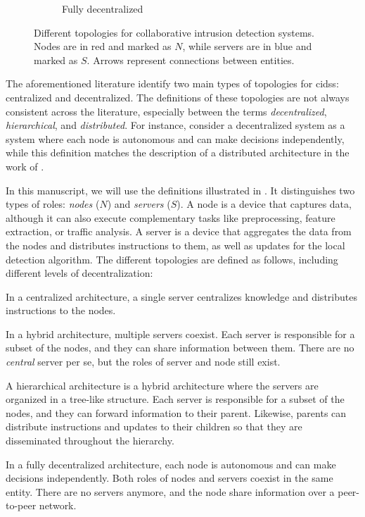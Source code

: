 \begin{figure}
\begin{subfigure}{.25\textwidth}
    \caption{Fully decentralized}
    \label{fig:bg.cids.decentralized}
  \end{subfigure}
  \caption[
    Different topologies for collaborative intrusion detection systems.
  ]{
    Different topologies for collaborative intrusion detection systems.
    Nodes are in red and marked as $N$, while servers are in blue and marked as $S$.
    Arrows represent connections between entities.
    \label{fig:bg.cids.topoligies}
  } 
\end{figure}

The aforementioned literature identify two main types of topologies for \glspl{cids}: centralized and decentralized. %
The definitions of these topologies are not always consistent across the literature, especially between the terms \emph{decentralized}, \emph{hierarchical}, and \emph{distributed}.
For instance, \textcite{zhou_surveycoordinatedattacks_2010} consider a decentralized system as a system where each node is autonomous and can make decisions independently, while this definition matches the description of a distributed architecture in the work of \textcite{li_SurveyingTrustBasedCollaborative_2022}.

In this manuscript, we will use the definitions illustrated in .
It distinguishes two types of roles: \emph{nodes} ($N$) and \emph{servers} ($S$).
A node is a device that captures data, although it can also execute complementary tasks like preprocessing, feature extraction, or traffic analysis.
A server is a device that aggregates the data from the nodes and distributes instructions to them, as well as updates for the local detection algorithm.
The different topologies are defined as follows, including different levels of decentralization:
\begin{description}[labelindent=1em]
  \item[Centralized.] In a centralized architecture, a single server centralizes knowledge and distributes instructions to the nodes.
  
  \item[Hybrid.] In a hybrid architecture, multiple servers coexist.
  Each server is responsible for a subset of the nodes, and they can share information between them.
  There are no \emph{central} server per se, but the roles of server and node still exist.
  
  \item[Hierarchical.] A hierarchical architecture is a hybrid architecture where the servers are organized in a tree-like structure.
  Each server is responsible for a subset of the nodes, and they can forward information to their parent.
  Likewise, parents can distribute instructions and updates to their children so that they are disseminated throughout the hierarchy.
  
  \item[Fully decentralized.] In a fully decentralized architecture, each node is autonomous and can make decisions independently.
  Both roles of nodes and servers coexist in the same entity.
  There are no servers anymore, and the node share information over a peer-to-peer network.
\end{description}


